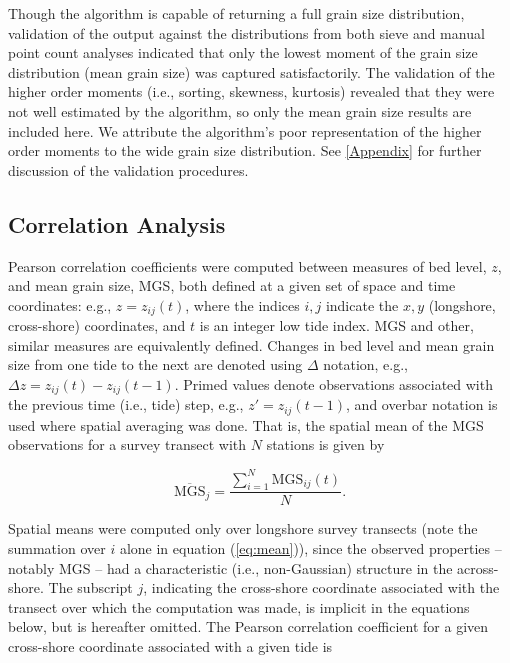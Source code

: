 \documentclass[preprint,12pt,authoryear]{elsarticle}
\begin{document}
Though the algorithm is capable of returning a full grain size distribution, validation of the output against the distributions from both sieve and manual point count analyses \citep[see][or \ref{Appendix} for a description of the point count method]{Barnard_etal2007, Buscombe_etal2010} indicated that only the lowest moment of the grain size distribution (mean grain size) was captured satisfactorily. The validation of the higher order moments (i.e., sorting, skewness, kurtosis) revealed that they were not well estimated by the algorithm, so only the mean grain size results are included here. We attribute the algorithm's poor representation of the higher order moments to the wide grain size distribution. See \ref{Appendix} for further discussion of the validation procedures.


\subsection{Correlation Analysis}\label{Methods:Correlation}

Pearson correlation coefficients were computed between measures of bed level, $z$, and mean grain size, MGS, both defined at a given set of space and time coordinates: e.g., $z=z_{ij}(t)$, where the indices $i,j$ indicate the $x,y$ (longshore, cross-shore) coordinates, and $t$ is an integer low tide index. MGS and other, similar measures are equivalently defined. Changes in bed level and mean grain size from one tide to the next are denoted using $\Delta$ notation, e.g., $\Delta z = z_{ij}(t) - z_{ij}(t-1)$. Primed values denote observations associated with the previous time (i.e., tide) step, e.g., $z'=z_{ij}(t-1)$, and overbar notation is used where spatial averaging was done. That is, the spatial mean of the MGS observations for a survey transect with $N$ stations is given by 

\begin{equation}\label{eq:mean}
\overline{\mathrm{MGS}}_j = \frac{\sum_{i=1}^{N} \mathrm{MGS}_{ij}(t)}{N}. 
\end{equation}

\noindent Spatial means were computed only over longshore survey transects (note the summation over $i$ alone in equation (\ref{eq:mean})), since the observed properties -- notably MGS -- had a characteristic (i.e., non-Gaussian) structure in the across-shore. The subscript $j$, indicating the cross-shore coordinate associated with the transect over which the computation was made, is implicit in the equations below, but is hereafter omitted. The Pearson correlation coefficient for a given cross-shore coordinate associated with a given tide is
\end{document}
